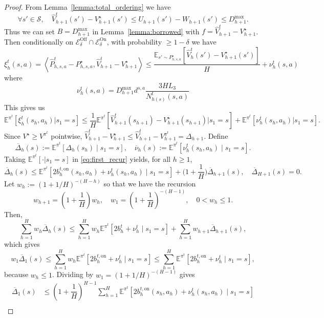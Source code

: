 \documentclass[twoside]{article}
\newcommand{\on}{\mathrm{on}} %
\newcommand{\bont}{b_h^{t,\on}} %
\newcommand{\lowv}{W} %
\newcommand{\highv}{U} %
\begin{document}
\begin{proof}
From Lemma~\ref{lemma:total_ordering} we have 
\[ 
\forall s' \in \mathcal{S}, \quad \widehat{V}_{h+1}^t(s') - V_{h+1}^\star(s') \le \highv_{h+1}(s') - \lowv_{h+1}(s') \le D_{h+1}^{\max}.
\]
Thus we can set $B = D_{h+1}^{\max}$ in Lemma~\ref{lemma:borrowed} with $f = \widehat{V}_{h+1}^t - V_{h+1}^\star$. Then conditionally on $\mathcal{E}^{\mathrm{Off}}_\delta\cap \mathcal{E}^{\mathrm{On}}_\delta$, with probability $\geq 1 - \delta$ we have
\[
\xi_h^{t}(s,a) = \left \langle \widehat{P}_{h,s,a}^{t} -P_{h,s,a}^{\star} ,  \widehat{V}_{h+1}^t - V_{h+1}^\star \right \rangle \le \frac{\mathbb{E}_{s' \sim P_{h,s,a}^{\star}} \left[ \widehat{V}_h^t(s') - V_{h+1}^\star(s') \right]}{H} + \nu_h^{t}(s,a)
\]
where 
\[
\nu_h^{t}(s,a) = D_{h+1}^{\max} d^{s,a}
    \frac{3 H L_3}
    {N_{h(s)}^t(s,a)}
\]
This gives us 
\[
\mathbb{E}^{\pi^t} \left[\xi_h^{t}(s_h,a_h)\Big| s_{1}=s\right]
 \le \frac{1}{H}
\mathbb{E}^{\pi^t} \left[\widehat{V}_{h+1}^{t}(s_{h+1})-V_{h+1}^\star(s_{h+1})\Big| s_{1}=s\right] + 
\mathbb{E}^{\pi^t} \left[\nu_h^{t}(s_h,a_h)\Big| s_{1}=s\right].
\]
Since \(V^\star\ge V^{\pi^t}\) pointwise, \(\widehat{V}_{h+1}^{t}-V_{h+1}^\star\le \widehat{V}_{h+1}^{t}-V_{h+1}^{\pi^t}=\Delta_{h+1}\).
Define
\[
\overline{\Delta}_h(s):=\mathbb{E}^{\pi^t} \left[\Delta_h(s_h)\mid s_{1}=s\right],\quad
\overline{\nu}_h(s):=\mathbb{E}^{\pi^t} \left[\nu_h^{t}(s_h,a_h)\mid s_{1}=s\right].
\]
Taking \(\mathbb{E}^{\pi^t}[\cdot| s_{1}=s]\) in \eqref{eq:first_recur} yields, for all \(h\ge 1\),
\begin{equation}
\label{eq:recur2}
\overline{\Delta}_h(s) \le \mathbb{E}^{\pi^t} \left[2\bont(s_h,a_h)+\nu_h^{t}(s_h,a_h)\mid s_{1}=s\right] + \Big(1+\frac{1}{H}\Big)\overline{\Delta}_{h+1}(s),
\quad \overline{\Delta}_{H+1}(s)=0.
\end{equation}
Let $w_h:=( 1+1/H )^{-(H-h)}$ so that we have the recursion
\[w_{h+1}=\left ( 1+\dfrac{1}{H} \right ) w_h, \quad w_{1}=\left ( 1+\dfrac{1}{H} \right )^{-(H-1)}, \quad 0<w_h\le 1.\]
%
Then,
%
\[
\sum_{h=1}^H w_h\overline{\Delta}_h(s) \le \sum_{h=1}^H w_h\mathbb{E}^{\pi^t} \left[2b_h^{t}+\nu_h^{t}\mid s_{1}=s\right] + \sum_{h=1}^H w_{h+1}\overline{\Delta}_{h+1}(s),
\]
which gives
\[
w_{1}\overline{\Delta}_{1}(s) \le \sum_{h=1}^H w_h\mathbb{E}^{\pi^t} \left[2\bont+\nu_h^{t}\mid s_{1}=s\right]
 \le \sum_{h=1}^H \mathbb{E}^{\pi^t} \left[2\bont+\nu_h^{t}\mid s_{1}=s\right],
\]
because \(w_h\le 1\). Dividing by $w_{1}=(1+1/H)^{-(H-1)}$ gives
\begin{align*}
\overline{\Delta}_{1}(s) & \le \left ( 1+\dfrac{1}{H} \right )^{H-1} \sum_{h=1}^H \mathbb{E}^{\pi^t} \left[2\bont(s_h,a_h)+\nu_h^{t}(s_h,a_h)\mid s_{1}=s\right] \\

\end{align*}
\end{proof}
\end{document}
